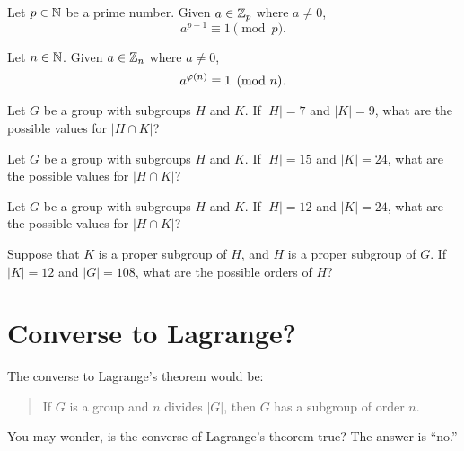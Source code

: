\documentclass{ximera}
\begin{document}
\begin{corollary}
  Let $p\in \mathbb N$ be a prime number. Given $a\in\mathbb Z_p$ where $a\ne 0$,
  \[
  a^{p-1}\equiv 1 \pmod{p}.
  \]
\end{corollary}


\begin{corollary}
  Let $n\in \mathbb N$. Given $a\in\mathbb Z_n$ where $a\ne 0$,
  \[
  a^{\eulerphi(n)}\equiv 1 \pmod{n}.
  \]
\end{corollary}



\begin{exercise}
  Let $G$ be a group with subgroups $H$ and $K$. If $|H|=7$ and $|K| =
  9$, what are the possible values for $|H\cap K|$?
\end{exercise}


\begin{exercise}
  Let $G$ be a group with subgroups $H$ and $K$. If $|H|=15$ and $|K|
  = 24$, what are the possible values for $|H\cap K|$?
\end{exercise}


\begin{exercise}
  Let $G$ be a group with subgroups $H$ and $K$. If $|H|=12$ and $|K|
  = 24$, what are the possible values for $|H\cap K|$?
\end{exercise}

\begin{exercise}
  Suppose that $K$ is a proper subgroup of $H$, and $H$ is a proper
  subgroup of $G$. If $|K| =12$ and $|G| = 108$, what are the possible
  orders of $H$?
\end{exercise}


\section{Converse to Lagrange?}


The converse to Lagrange's theorem would be:
\begin{quote}
  If $G$ is a group and $n$ divides $|G|$, then $G$ has a subgroup of
  order $n$.
\end{quote}

You may wonder, is the converse of Lagrange's theorem true? The answer
is ``no.''
\end{document}
